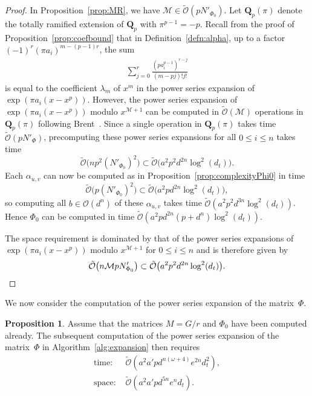 \documentclass[a4paper,11pt]{article}
\numberwithin{equation}{section}
\newcommand{\QQ}{\mathbf{Q}} %
\providecommand{\BigOh}{\mathcal{O}}          %
\providecommand{\SoftOh}{\tilde{\mathcal{O}}} %
\theoremstyle{definition}
\newtheorem{prop}[thm]{Proposition}
\begin{document}
\begin{proof}
In Proposition~\ref{prop:MR}, we have $\mathcal{M} \in \SoftOh(pN'_{\Phi_0})$.
Let $\QQ_p(\pi)$ denote the totally ramified extension of $\QQ_p$ with $\pi^{p-1}=-p$.
Recall from the proof of Proposition~\ref{prop:coefbound} that in Definition~\ref{defn:alpha},
up to a factor $(-1)^r (\pi a_i)^{m-(p-1)r}$, the sum
\begin{align*}
\sum_{j=0}^{r} \frac{(p a_i^{p-1})^{r-j}}{(m-pj)!j!}
\end{align*}
is equal to the coefficient $\lambda_{m}$ of $x^m$ in the power series expansion of $\exp(\pi a_i(x-x^p))$. However,
the power series expansion of $\exp(\pi a_i(x-x^p))$ modulo $x^{\mathcal{M}+1}$ can be computed in 
$\SoftOh(\mathcal{M})$ operations in $\QQ_p(\pi)$ following Brent~\citep{Brent1976}. Since
a single operation in $\QQ_p(\pi)$ takes time $\SoftOh(pN'_{\Phi})$, precomputing these
power series expansions for all $0 \leq i \leq n$ takes time 
\[
\SoftOh\bigl(n p^2 (N'_{\Phi_0})^2\bigr) \subset \SoftOh\bigl(a^2 p^2 d^{2n} \log^2(d_t)\bigr).
\]
Each $\alpha_{u,v}$ can now be computed as in Proposition~\ref{prop:complexityPhi0} in time 
\[
\SoftOh\bigl(p(N'_{\Phi_0})^2 \bigr) \subset \SoftOh\bigl(a^2 p d^{2n} \log^2(d_t)\bigr),
\]
so computing all $b \in \BigOh(d^n)$ of these $\alpha_{u,v}$ takes time 
$\SoftOh(a^2 p^2 d^{3n} \log^2(d_t))$. Hence $\Phi_0$
can be computed in time $\SoftOh(a^2 p d^{2n} (p + d^n) \log^2(d_t))$.

The space requirement is dominated by that of the power series expansions of $\exp(\pi a_i(x-x^p))$ modulo $x^{\mathcal{M}+1}$ for $0 \leq i \leq n$
and is therefore given by
\[
\SoftOh\bigl(n \mathcal{M} p N'_{\Phi_0}\bigr) \subset \SoftOh\bigl(a^2 p^2 d^{2n} \log^2(d_t)\bigr). \qedhere
\]
\end{proof}

We now consider the computation of the power series expansion of the 
matrix~$\Phi$.

\begin{prop}
Assume that the matrices $M = G/r$ and $\Phi_0$ have been computed already.
The subsequent computation of the power series expansion of the matrix~$\Phi$ 
in Algorithm~\ref{alg:expansion} then requires
\begin{align*}
\mbox{time: }  &\SoftOh(a^2 a' p d^{n(\omega+4)}e^{2n} d_t^2), \\
\mbox{space: } &\SoftOh(a^2 a' p d^{5n} e^n d_t).
\end{align*}
\end{prop}
\end{document}
